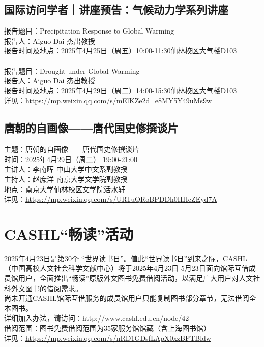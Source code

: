 \documentclass[letterpaper, 12pt]{article}
\begin{document}
\begin{multicols}{2}
\subsection{国际访问学者｜讲座预告：气候动力学系列讲座} %
报告题目：Precipitation Response to Global Warming
\\报告人：Aiguo Dai 杰出教授
\\报告时间及地点：2025年4月25日（周五）10:00-11:30仙林校区大气楼D103
\\
\\报告题目：Drought under Global Warming
\\报告人：Aiguo Dai 杰出教授
\\报告时间及地点：2025年4月29日（周二）14:00-15:30仙林校区大气楼D103
\\详见：\url{https://mp.weixin.qq.com/s/mElKZe2d_e8MY5Y49uMs9w}

\subsection{唐朝的自画像——唐代国史修撰谈片} %
主题：唐朝的自画像——唐代国史修撰谈片
\\时间：2025年4月29日（周二） 19:00-21:00
\\主讲人：李南晖 中山大学中文系副教授
\\主持人：赵庶洋 南京大学文学院副教授
\\地点：南京大学仙林校区文学院活水轩
\\详见：\url{https://mp.weixin.qq.com/s/URTuQRoBPDDh0HHcZEyd7A}

\section{CASHL“畅读”活动} %
2025年4月23日是第30个 “世界读书日”。值此“世界读书日”到来之际，CASHL（中国高校人文社会科学文献中心）将于2025年4月23日-5月23日面向馆际互借成员馆用户，全面推出“畅读”原版外文图书免费借阅活动，以满足广大用户对人文社科外文图书的借阅需求。
\\尚未开通CASHL馆际互借服务的成员馆用户只能复制图书部分章节，无法借阅全本图书。
\\详细加入办法，请访问：http://www.cashl.edu.cn/node/42
\\借阅范围：图书免费借阅范围为35家服务馆馆藏（含上海图书馆）
\\详见：\url{https://mp.weixin.qq.com/s/nRD1GDsfLApX0xzBFTBldw}

\end{multicols}
\end{document}

